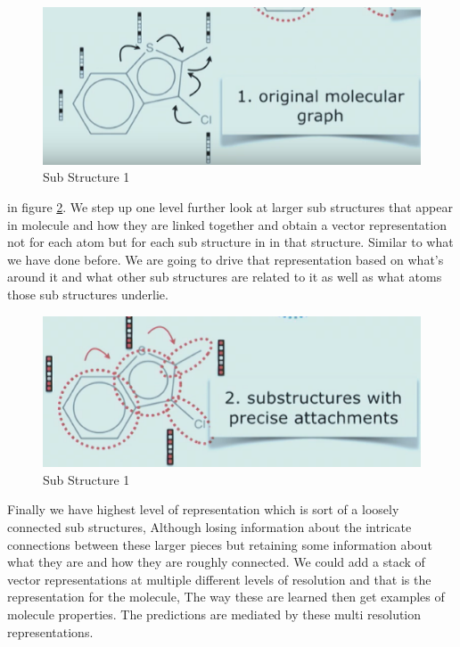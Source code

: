 \documentclass[10pt,twocolumn,letterpaper]{article}
\begin{document}
\begin{figure}[h!]
  \includegraphics[width=\linewidth]{graph_learn1.png}
  \caption{Sub Structure 1 }
  \label{fig:graph_learn1}
\end{figure}



in figure \ref{fig:graph_learn2}. We step up one level further look at larger sub structures that appear in molecule and how they are linked together and obtain a vector representation not for each atom but for each sub structure in in that structure. Similar to what we have done before. We are going to drive that representation based on what's around it and what other sub structures are related to it as well as what atoms those sub structures underlie. 

\begin{figure}[h!]
  \includegraphics[width=\linewidth]{graph_learn2.png}
  \caption{Sub Structure 1 }
  \label{fig:graph_learn2}
\end{figure}


Finally we have highest level of representation which is sort of a loosely connected sub structures, Although losing information about the intricate connections between these larger pieces but retaining some information about what they are and how they are roughly connected. We could add a stack of vector representations at multiple different levels of resolution and that is the representation for the molecule, The way these are learned then get examples of molecule properties. The predictions are mediated by these multi resolution representations\cite{Hamilton2017}.
\end{document}
